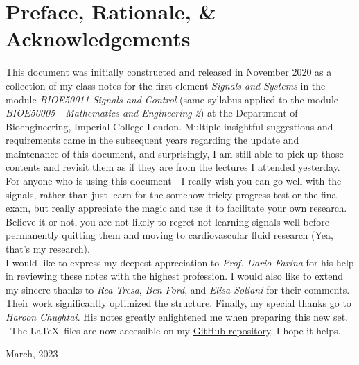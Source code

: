 \section*{Preface, Rationale, \& Acknowledgements}
This document was initially constructed and released in November 2020 as a collection of my class notes for the first element \textit{Signals and Systems} in the module \textit{BIOE50011-Signals and Control} (same syllabus applied to the module \textit{BIOE50005 - Mathematics and Engineering 2}) at the Department of Bioengineering, Imperial College London. Multiple insightful suggestions and requirements came in the subsequent years regarding the update and maintenance of this document, and surprisingly, I am still able to pick up those contents and revisit them as if they are from the lectures I attended yesterday. \\

For anyone who is using this document - I really wish you can go well with the signals, rather than just learn for the somehow tricky progress test or the final exam, but really appreciate the magic and use it to facilitate your own research. Believe it or not, you are not likely to regret not learning signals well before permanently quitting them and moving to cardiovascular fluid research (Yea, that's my research). \\

I would like to express my deepest appreciation to \emph{Prof. Dario Farina} for his help in reviewing these notes with the highest profession. I would also like to extend my sincere thanks to \emph{Rea Tresa}, \emph{Ben Ford}, and \emph{Elisa Soliani} for their comments. Their work significantly optimized the structure. Finally, my special thanks go to \emph{Haroon Chughtai}. His notes greatly enlightened me when preparing this new set. \\

\faGithub \ The \LaTeX \ files are now accessible on my \href{https://github.com/binghuan-li/Notes-and-Formula-Sheets}{GitHub repository}. I hope it helps. 

\begin{flushright}
March, 2023
\end{flushright}

